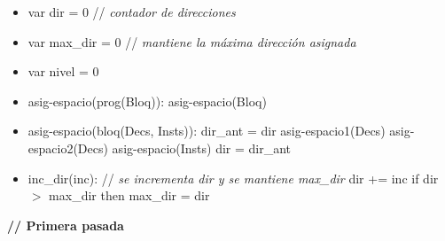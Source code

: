 \documentclass[11pt]{article}
\begin{document}
        \begin{itemize}
            \item var dir = 0 \/// \textit{contador de direcciones}
            \item var max\_dir = 0 \/// \textit{mantiene la máxima dirección asignada}
            \item var nivel = 0
            \item asig-espacio(prog(Bloq)): 
                \subitem asig-espacio(Bloq)
            \item asig-espacio(bloq(Decs, Insts)): 
                \subitem dir\_ant = dir
                \subitem asig-espacio1(Decs)
                \subitem asig-espacio2(Decs)
                \subitem asig-espacio(Insts)
                \subitem dir = dir\_ant
            \item inc\_dir(inc): \/// \textit{se incrementa dir y se mantiene max\_dir} 
                \subitem dir += inc
                \subitem if dir $>$ max\_dir then 
                    \subsubitem max\_dir = dir            
        \end{itemize}
        \textbf{\/// Primera pasada}
\end{document}

